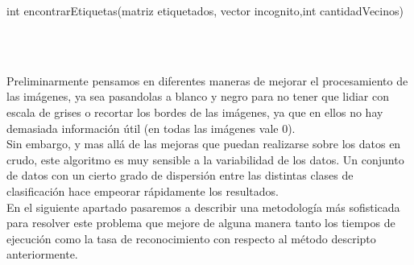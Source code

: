 \begin{algorithm}
\begin{algorithmic}[1]\parskip=1mm
\caption{int encontrarEtiquetas(matriz etiquetados, vector incognito,int cantidadVecinos)}
\ENDFOR
{}
\ENDWHILE\\
\end{algorithmic}
\end{algorithm}
\\
Preliminarmente pensamos en diferentes maneras de mejorar el procesamiento de las imágenes, ya sea pasandolas a blanco y negro para no tener que lidiar con escala de grises o recortar los bordes de las imágenes, ya que en ellos no hay demasiada información útil (en todas las imágenes vale 0).
\\
Sin embargo, y mas allá de las mejoras que puedan realizarse sobre los datos en crudo, este algoritmo es muy sensible a la variabilidad de los datos. Un conjunto de datos con un cierto grado de dispersión entre las distintas clases de clasificación hace empeorar rápidamente los resultados.
\\
En el siguiente apartado pasaremos a describir una metodología más sofisticada para resolver este problema que mejore de alguna manera tanto los tiempos de ejecución como la tasa de reconocimiento con respecto al método descripto anteriormente.

